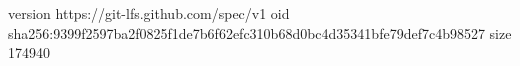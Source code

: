 version https://git-lfs.github.com/spec/v1
oid sha256:9399f2597ba2f0825f1de7b6f62efc310b68d0bc4d35341bfe79def7c4b98527
size 174940
